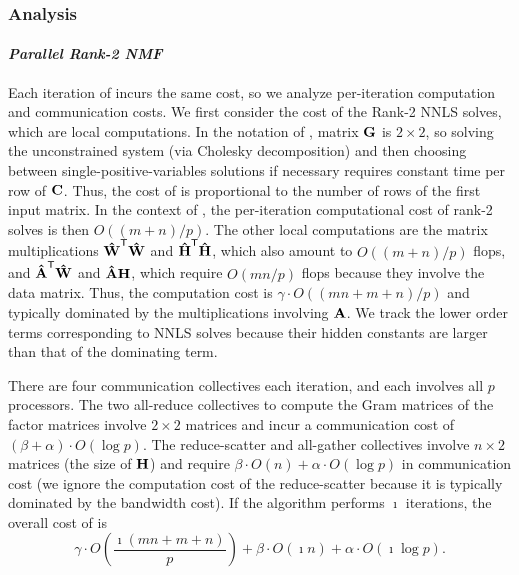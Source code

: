 \documentclass[conference,compsoc]{IEEEtran}
\begin{document}
\subsubsection{Analysis}
\label{sec:analysis}

\paragraph{\emph{Parallel Rank-2 NMF}}

Each iteration of  incurs the same cost, so we analyze per-iteration computation and communication costs.
We first consider the cost of the Rank-2 NNLS solves, which are local computations.
In the notation of , matrix $\M{G}$ is $2\times 2$, so solving the unconstrained system (via Cholesky decomposition) and then choosing between single-positive-variables solutions if necessary requires constant time per row of $\M{C}$.
Thus, the cost of  is proportional to the number of rows of the first input matrix.
In the context of , the per-iteration computational cost of rank-2 solves is then $O((m+n)/p)$.
The other local computations are the matrix multiplications $\M[\hat]{W}^\Tra \M[\hat]{W}$ and $\M[\hat]{H}^\Tra \M[\hat]{H}$, which also amount to $O((m+n)/p)$ flops, and $\M[\hat]{A}^\Tra \M[\hat]{W}$ and $\M[\hat]{A} \M{H}$, which require $O(mn/p)$ flops because they involve the data matrix.
Thus, the computation cost is $\gamma \cdot O((mn+m+n)/p)$ and typically dominated by the multiplications involving $\M{A}$.
We track the lower order terms corresponding to NNLS solves because their hidden constants are larger than that of the dominating term.

There are four communication collectives each iteration, and each involves all $p$ processors.
The two all-reduce collectives to compute the Gram matrices of the factor matrices involve $2\times 2$ matrices and incur a communication cost of $(\beta + \alpha) \cdot O(\log p)$.
The reduce-scatter and all-gather collectives involve $n\times 2$ matrices (the size of $\M{H}$) and require $\beta \cdot O(n) + \alpha \cdot O(\log p)$ in communication cost (we ignore the computation cost of the reduce-scatter because it is typically dominated by the bandwidth cost).
If the algorithm performs $\imath$ iterations, the overall cost of  is
\begin{equation}
\label{eq:r2nmfcost}
\gamma \cdot O\left( \frac{\imath (mn+m+n)}{p} \right) + \beta \cdot O(\imath n) + \alpha \cdot O(\imath \log p).
\end{equation}
\end{document}
